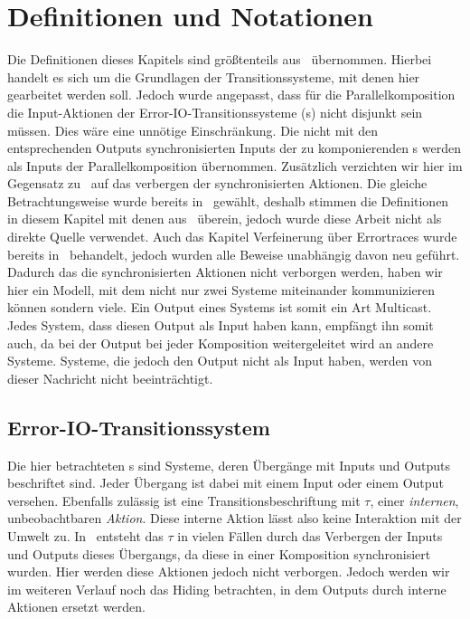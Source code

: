 \chapter{Definitionen und Notationen}

Die Definitionen dieses Kapitels sind größtenteils aus~\cite{Vogler2014EIO}
übernommen. Hierbei handelt es sich um die Grundlagen der Transitionssysteme, mit denen
hier gearbeitet werden soll. Jedoch wurde angepasst, dass für die
Parallelkomposition die Input-Aktionen der Error-IO-Transitionssysteme
(\EIO{}s) nicht disjunkt sein müssen. Dies wäre eine unnötige Einschränkung.
Die nicht mit den entsprechenden Outputs synchronisierten Inputs der zu komponierenden \EIO{}s werden als
Inputs der Parallelkomposition übernommen. Zusätzlich verzichten wir hier im
Gegensatz zu~\cite{Vogler2014EIO} auf
das verbergen der synchronisierten Aktionen. Die gleiche Betrachtungsweise
wurde bereits in~\cite{Schlosser2012BA} gewählt, deshalb stimmen die
Definitionen in diesem Kapitel mit denen aus~\cite{Schlosser2012BA} überein,
jedoch wurde diese Arbeit nicht als direkte Quelle verwendet. Auch das Kapitel
Verfeinerung über Errortraces wurde bereits in~\cite{Schlosser2012BA}
behandelt, jedoch wurden alle Beweise unabhängig davon neu geführt.\\
Dadurch das die synchronisierten Aktionen nicht verborgen werden, haben wir hier
ein Modell, mit dem nicht nur zwei Systeme miteinander kommunizieren können
sondern viele. Ein Output eines Systems ist somit ein Art Multicast. Jedes
System, dass diesen Output als Input haben kann, empfängt ihn somit auch, da
bei der Output bei jeder Komposition weitergeleitet wird an andere Systeme.
Systeme, die jedoch den Output nicht als Input haben, werden von dieser
Nachricht nicht beeinträchtigt.

\section{Error-IO-Transitionssystem}
Die hier betrachteten \EIO{}s sind Systeme, deren Übergänge mit Inputs und Outputs
beschriftet sind. Jeder Übergang ist dabei mit einem Input oder einem Output
versehen. Ebenfalls zulässig ist eine Transitionsbeschriftung mit $\tau$, einer
\emph{internen}, unbeobachtbaren \emph{Aktion}. Diese interne
Aktion lässt also keine Interaktion mit
der Umwelt zu. In~\cite{Vogler2014EIO} entsteht das $\tau$ in vielen Fällen
durch das Verbergen der Inputs und Outputs dieses Übergangs, da diese in einer
Komposition synchronisiert wurden. Hier werden diese Aktionen jedoch nicht
verborgen. Jedoch werden wir im weiteren Verlauf noch das Hiding betrachten, in
dem Outputs durch interne Aktionen ersetzt werden.


